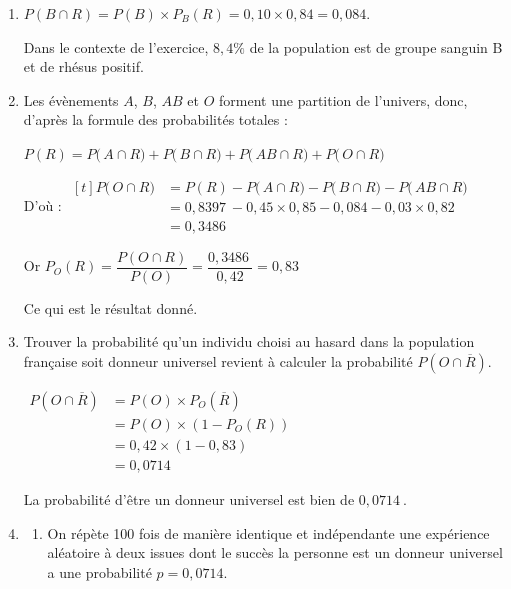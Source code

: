\documentclass[10pt]{article}
\providecommand{\np}[2][]{{#2~#1}}
\begin{document}
\begin{enumerate}
\emph{Remarque :} les deux probabilités en rouge n'étaient pas attendues ici. On peut compléter ces deux branches après avoir répondu à la question \textbf{3.}

\item  $P(B \cap R)=P(B) \times P_B(R)= 0,10 \times 0,84=0,084$.

Dans le contexte de l'exercice, $8,4\%$ de la population est de groupe sanguin B et de rhésus positif.

\item   Les évènements $A$, $B$, $AB$  et $O$ forment une partition de l'univers, donc, d'après la formule des probabilités totales :

\quad $P(R) = P\big(\,A\cap R\big) + P\big(\,B\cap R\big) +  P\big(\,AB\cap R\big) +P\big(\,O\cap R\big) $

D'où :\quad 
$\begin{aligned}[t] P\big(\,O\cap R\big)&  = P(R)  -P\big(\,A\cap R\big) - P\big(\,B\cap R\big) -  P\big(\,AB\cap R\big) \\
	&= \np{0,8397} - 0,45\times 0,85 - 0,084 - 0,03 \times 0,82\\
	& = \np{0,3486}
\end{aligned}$

Or $P_O(R)=\dfrac{P(O\cap R) }{P(O)}= \dfrac{\np{0,3486}}{0,42}= 0,83$

Ce qui est le résultat donné.

\item Trouver  la probabilité qu'un individu choisi au hasard dans la population française soit donneur universel  revient à calculer la probabilité  $P\left( O\cap \overline{R} \right)$.

$\begin{aligned} P\left( O\cap \overline{R} \right)& = P(O)\times P_{O}\left(\overline{R}\right)\\
	&= P(O)\times \left(1- P_{O}(R)\right)\\
	&= 0,42 \times (1 - 0,83)\\
	&= 0,0714
\end{aligned}$

La probabilité d'être un donneur universel est bien  de $\np{0,0714}$.

\item
	\begin{enumerate}
		\item  On répète 100 fois de manière identique et indépendante une expérience aléatoire à deux issues dont le succès \og la personne est un donneur universel\fg{}  a une probabilité $p=0,0714$.


\end{enumerate}
\end{enumerate}
\end{document}
